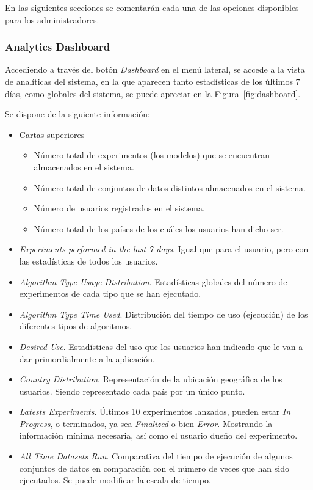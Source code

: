 
En las siguientes secciones se comentarán cada una de las opciones disponibles para los administradores.

\subsubsection{Analytics Dashboard}
Accediendo a través del botón \textit{Dashboard} en el menú lateral, se accede a la vista de analíticas del sistema, en la que aparecen tanto estadísticas de los últimos 7 días, como globales del sistema, se puede apreciar en la Figura~\ref{fig:dashboard}.


Se dispone de la siguiente información:
\begin{itemize}
\item Cartas superiores
\begin{itemize}
	\item Número total de experimentos (los modelos) que se encuentran almacenados en el sistema.
	\item Número total de conjuntos de datos distintos almacenados en el sistema.
	\item Número de usuarios registrados en el sistema.
	\item Número total de los países de los cuáles los usuarios han dicho ser.
\end{itemize}
\item \textit{Experiments performed in the last 7 days}. Igual que para el usuario, pero con las estadísticas de todos los usuarios. 
\item \textit{Algorithm Type Usage Distribution}. Estadísticas globales del número de experimentos de cada tipo que se han ejecutado.
\item \textit{Algorithm Type Time Used}. Distribución del tiempo de uso (ejecución) de los diferentes tipos de algoritmos.
\item \textit{Desired Use}. Estadísticas del uso que los usuarios han indicado que le van a dar primordialmente a la aplicación.
\item \textit{Country Distribution}. Representación de la ubicación geográfica de los usuarios. Siendo representado cada país por un único punto.
\item \textit{Latests Experiments}. Últimos 10 experimentos lanzados, pueden estar \textit{In Progress}, o terminados, ya sea \textit{Finalized} o bien \textit{Error}. Mostrando la información mínima necesaria, así como el usuario dueño del experimento.
\item \textit{All Time Datasets Run}. Comparativa del tiempo de ejecución de algunos conjuntos de datos en comparación con el número de veces que han sido ejecutados. Se puede modificar la escala de tiempo.
\end{itemize}

